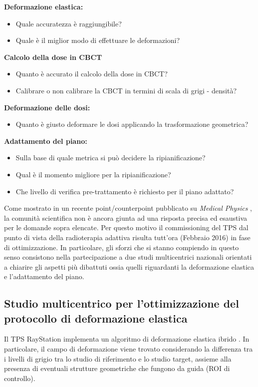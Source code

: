 \noindent\textbf{Deformazione elastica:}
\begin{itemize}
\item Quale accuratezza è raggiungibile?
\item Quale è il miglior modo di effettuare le deformazioni?
\end{itemize}
\textbf{Calcolo della dose in CBCT}
\begin{itemize}
\item Quanto è accurato il calcolo della dose in CBCT?
\item Calibrare o non calibrare la CBCT in termini di scala di grigi - densità?
\end{itemize}
\textbf{Deformazione delle dosi:}
\begin{itemize}
\item Quanto è giusto deformare le dosi applicando la trasformazione geometrica?
\end{itemize}
\textbf{Adattamento del piano:}
\begin{itemize}
\item Sulla base di quale metrica si può decidere la ripianificazione?
\item Qual è il momento migliore per la ripianificazione?
\item Che livello di verifica pre-trattamento è richiesto per il piano adattato?
\end{itemize}

Come mostrato in un recente point/counterpoint pubblicato su \textit{Medical Physics} \cite{Schultheiss2012}, la comunità scientifica non è ancora giunta ad una risposta precisa ed esaustiva per le domande sopra elencate. Per questo motivo il commissioning del TPS dal punto di vista della radioterapia adattiva risulta tutt'ora (Febbraio 2016) in fase di ottimizzazione. In particolare, gli sforzi che si stanno compiendo in questo senso consistono nella partecipazione a due studi multicentrici nazionali orientati a chiarire gli aspetti più dibattuti ossia quelli riguardanti la deformazione elastica e l'adattamento del piano.

\subsection{Studio multicentrico per l'ottimizzazione del protocollo di deformazione elastica}
Il TPS RayStation implementa un algoritmo di deformazione elastica ibrido \cite{RaySearchLaboratories2014}. In particolare, il campo di deformazione viene trovato considerando la differenza tra i livelli di grigio tra lo studio di riferimento e lo studio target, assieme alla presenza di eventuali strutture geometriche che fungono da guida (ROI di controllo).

